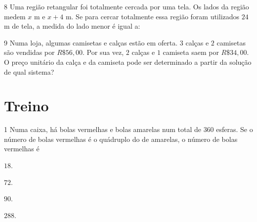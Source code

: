 {{{{

\num{8}  Uma região retangular foi totalmente cercada por uma tela. Os lados
da região medem $x$ m e $x + 4$ m.
Se para cercar totalmente essa região foram utilizados $24$ m de tela, a
medida do lado menor é igual a:


\begin{mdframed}[linewidth=2pt,linecolor=white,roundcorner=10pt]
\vspace{6cm}
\end{mdframed}

\num{9} Numa loja, algumas camisetas e calças estão em oferta. $3$ calças e $2$
camisetas são vendidas por $R\$ 56,00$. Por sua vez, $2$ calças e $1$ camiseta
saem por $R\$ 34,00$. O preço unitário da calça e da camiseta pode ser
determinado a partir da solução de qual sistema?

\begin{mdframed}[linewidth=2pt,linecolor=white,roundcorner=10pt]

\vspace{6cm}
\end{mdframed}

\section*{Treino}

\num{1}  Numa caixa, há bolas vermelhas e bolas amarelas num total de $360$
esferas. Se o número de bolas vermelhas é o quádruplo do de amarelas, o
número de bolas vermelhas é

\begin{escolha}
\item $18$.
\item $72$.
\item $90$.
\item $288$.
\end{escolha}


}}}}
